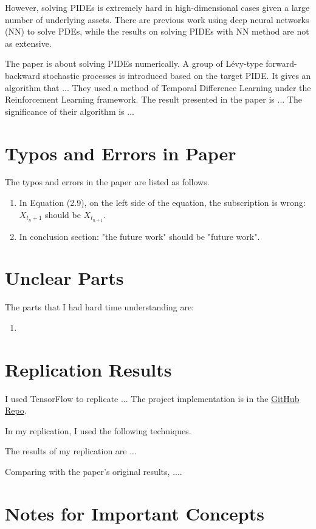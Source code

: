 \documentclass[12pt,letterpaper,oneside]{article}
\begin{document}
	However, solving PIDEs is extremely hard in high-dimensional cases given a large number of underlying assets. There are previous work using deep neural networks (NN) to solve PDEs, while the results on solving PIDEs with NN method are not as extensive.
	
	The paper is about solving PIDEs numerically. A group of L\'evy-type forward-backward stochastic processes is introduced based on the target PIDE. It gives an algorithm that ... They used a method of Temporal Difference Learning under the Reinforcement Learning framework.  The result presented in the paper is ... The significance of their algorithm is ...

	
\section{Typos and Errors in Paper}
	The typos and errors in the paper are listed as follows.
	\begin{enumerate}
		\item In Equation (2.9), on the left side of the equation, the subscription is wrong: $ X_{t_{n}+1} $ should be $ X_{t_{n+1}} $.
		\item In conclusion section: "the future work" should be "future work".
	\end{enumerate}


\section{Unclear Parts}
	The parts that I had hard time understanding are:
	
	\begin{enumerate}
		\item 
	\end{enumerate}

\section{Replication Results}
	I used TensorFlow to replicate ... The project implementation is in the \href{https://github.com/GN-Yu/TSRL-project}{GitHub Repo}.
	
	In my replication, I used the following techniques.
	
	The results of my replication are ... 
	
	Comparing with the paper's original results, ....
	
	
	
\section{Notes for Important Concepts}
\end{document}

